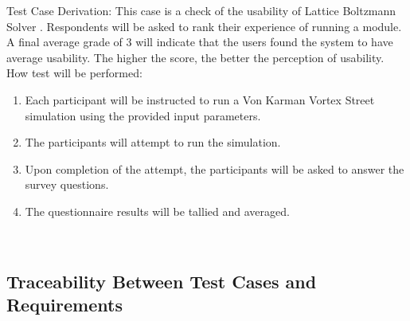 \documentclass[12pt, titlepage]{article}
\newcommand{\famname}{Lattice Boltzmann Solver}
\begin{document}
\begin{enumerate}
Test Case Derivation: This case is a check of the usability of {\famname}
. Respondents will be asked to rank their experience of running a module. A
final average grade of 3 will indicate that the users found the system to have
average usability. The higher the score, the better the perception of
usability.\\
	
How test will be performed: 

\begin{enumerate}
\item Each participant will be instructed to run a Von Karman Vortex Street
simulation using the provided input parameters.
\item The participants will attempt to run the simulation.
\item Upon completion of the attempt, the participants will be asked to answer
the survey questions.
\item The questionnaire results will be tallied and averaged.
\end{enumerate}

\end{enumerate}

~\newpage
\subsection{Traceability Between Test Cases and Requirements}
\end{document}
